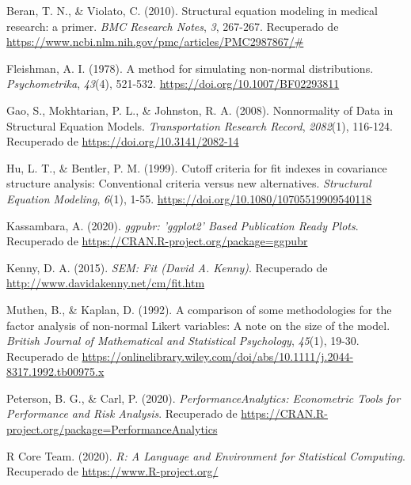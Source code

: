 \documentclass[
]{article}
\newlength{\cslhangindent}
\newenvironment{cslreferences}%
  {\setlength{\parindent}{0pt}%
  \everypar{\setlength{\hangindent}{\cslhangindent}}\ignorespaces}%
  {\par}
\begin{document}
\hypertarget{refs}{}
\begin{cslreferences}
\leavevmode\hypertarget{ref-Beran2010StructuralEM}{}%
Beran, T. N., \& Violato, C. (2010). Structural equation modeling in
medical research: a primer. \emph{BMC Research Notes}, \emph{3},
267-267. Recuperado de
\url{https://www.ncbi.nlm.nih.gov/pmc/articles/PMC2987867/\#}

\leavevmode\hypertarget{ref-Fleishman1978}{}%
Fleishman, A. I. (1978). A method for simulating non-normal
distributions. \emph{Psychometrika}, \emph{43}(4), 521-532.
\url{https://doi.org/10.1007/BF02293811}

\leavevmode\hypertarget{ref-gao}{}%
Gao, S., Mokhtarian, P. L., \& Johnston, R. A. (2008). Nonnormality of
Data in Structural Equation Models. \emph{Transportation Research
Record}, \emph{2082}(1), 116-124. Recuperado de
\href{\%20https://doi.org/10.3141/2082-14}{https://doi.org/10.3141/2082-14}

\leavevmode\hypertarget{ref-Hu1999}{}%
Hu, L. T., \& Bentler, P. M. (1999). Cutoff criteria for fit indexes in
covariance structure analysis: Conventional criteria versus new
alternatives. \emph{Structural Equation Modeling}, \emph{6}(1), 1-55.
\url{https://doi.org/10.1080/10705519909540118}

\leavevmode\hypertarget{ref-ggpubr}{}%
Kassambara, A. (2020). \emph{ggpubr: 'ggplot2' Based Publication Ready
Plots}. Recuperado de \url{https://CRAN.R-project.org/package=ggpubr}

\leavevmode\hypertarget{ref-Kenny2015}{}%
Kenny, D. A. (2015). \emph{SEM: Fit (David A. Kenny)}. Recuperado de
\url{http://www.davidakenny.net/cm/fit.htm}

\leavevmode\hypertarget{ref-muthen}{}%
Muthen, B., \& Kaplan, D. (1992). A comparison of some methodologies for
the factor analysis of non-normal Likert variables: A note on the size
of the model. \emph{British Journal of Mathematical and Statistical
Psychology}, \emph{45}(1), 19-30. Recuperado de
\url{https://onlinelibrary.wiley.com/doi/abs/10.1111/j.2044-8317.1992.tb00975.x}

\leavevmode\hypertarget{ref-PerformanceAnalytics}{}%
Peterson, B. G., \& Carl, P. (2020). \emph{PerformanceAnalytics:
Econometric Tools for Performance and Risk Analysis}. Recuperado de
\url{https://CRAN.R-project.org/package=PerformanceAnalytics}

\leavevmode\hypertarget{ref-R}{}%
R Core Team. (2020). \emph{R: A Language and Environment for Statistical
Computing}. Recuperado de \url{https://www.R-project.org/}


\end{cslreferences}
\end{document}
